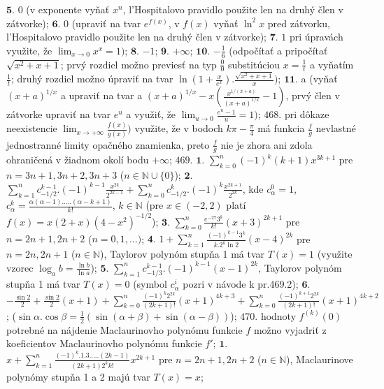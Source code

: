 $\boldsymbol{5.}$ $0$ (v exponente vyňať $x^{n}$, l'Hospitalovo pravidlo použite len na druhý člen v zátvorke);
$\boldsymbol{6.}$ $0$ (upraviť na tvar $e^{f(x)}$, v $f(x)$ vyňať $\ln ^{2}x$ pred zátvorku, l'Hospitalovo pravidlo použite len na druhý člen v zátvorke);
$\boldsymbol{7.}$ $1$ pri úpravách využite, že $\lim_{x \to 0}x^{x}=1)$;
$\boldsymbol{8.}$ $-1$;
$\boldsymbol{9.}$ $+\infty$;
$\boldsymbol{10.}$ $-\frac{1}{6}$ (odpočítať a pripočítať $\sqrt{x^{2}+x+1}$; prvý rozdiel možno previesť na typ $\frac{0}{0}$ substitúciou $x=\frac{1}{t}$ a vyňatím $\frac{1}{t}$; druhý rozdiel možno úpraviť na tvar $\ln (1+\frac{x}{e^{x}}).\frac{\sqrt{x^{2}+x+1}}{x})$;
$\boldsymbol{11.}$ a (vyňať $(x+a)^{1/x}$ a upraviť na tvar a $(x+a)^{1/x}-x(\frac{x^{1/(x+a)}}{(x+a)^{1/x}}-1)$, prvý člen v zátvorke upraviť na tvar $e^{u}$ a využiť, že $\lim_{u \to 0}\frac{e^{u}-1}{u}=1)$;
$\boxed{468.}$ pri dôkaze neexistencie $\lim_{x \to +\infty}\frac{f(x)}{g(x)})$ využite, že v bodoch $k\pi - \frac{\pi}{4}$ má funkcia $\frac{f}{g}$ nevlastné jednostranné limity opačného znamienka, preto  $\frac{f}{g}$ nie je zhora ani zdola ohraničená v žiadnom okolí bodu  $+\infty$;
$\boxed{469.}$ $\boldsymbol{1.}$ $\sum_{k=0}^n (-1)^{k}(k+1)x^{3k+1}$ pre $n=3n+1, 3n+2, 3n+3$ ($n\in \mathbb{N} \cup \lbrace 0 \rbrace $);
$\boldsymbol{2.}$ $\sum_{k=1}^n c^{k-1}_{-1/2}.(-1)^{k-1}\frac{x^{2k}}{2^{2k-1}}+\sum_{k=0}^n c^{k}_{-1/2}.(-1)^{k}\frac{x^{2k+1}}{2^{2k}}$, kde $c_{\alpha}^{0}=1$, $c_{\alpha}^{k}=\frac{\alpha(\alpha -1).....(\alpha -k+1)}{k!}$, $k\in \mathbb{N}$ (pre $x \in (-2,2)$ platí $f(x)=x(2+x)(4-x^{2})^{-1/2}$);
$\boldsymbol{3.}$ $\sum_{k=0}^n \frac{e^{-27}3^{k}}{k!}(x+3)^{2k+1}$ pre $n=2n+1,2n+2$ ($n=0,1,...)$;
$\boldsymbol{4.}$ $ 1+ \sum_{k=1}^n \frac{(-1)^{k-1}3^{k}}{k.2^{k}\ln 2}(x-4)^{2k}$ pre $n=2n,2n+1$  ($n\in \mathbb{N}$), Taylorov polynóm stupňa 1 má tvar $T(x)=1$ (využite vzorec $\log _{a} b=\frac{\ln b}{\ln a}$);
$\boldsymbol{5.}$ $\sum_{k=1}^n c^{k-1}_{-1/3}.(-1)^{k-1}(x-1)^{2k}$, Taylorov polynóm stupňa 1 má tvar $T(x)=0$ (symbol $c^{i}_{\alpha}$ pozri v návode k pr.469.2);
$\boldsymbol{6.}$ $-\frac{\sin 2}{2}+\frac{\sin 2}{2}(x+1)+\sum_{k=0}^n \frac{(-1)^{k}2^{2k}}{(2k+1)!}(x+1)^{4k+3}+\sum_{k=0}^n \frac{(-1)^{k+1}2^{2k}}{(2k+1)!}(x+1)^{4k+2}$; ($\sin \alpha .\cos \beta =\frac{1}{2}(\sin (\alpha +\beta)+\sin (\alpha -\beta))$);
$\boxed{470.}$ hodnoty $f^{(k)}(0)$ potrebné na nájdenie Maclaurinovho polynómu funkcie $f$ možno vyjadriť z koeficientov Maclaurinovho polynómu funkcie $f'$;
$\boldsymbol{1.}$ $x+\sum_{k=1}^n \frac{(-1)^{k}.1.3.....(2k-1)}{(2k+1)2^{k}k!} x^{2k+1}$ pre $n=2n+1,2n+2$ ($n\in \mathbb{N}$), Maclaurinove polynómy stupňa 1 a 2 majú tvar $T(x)=x$;

